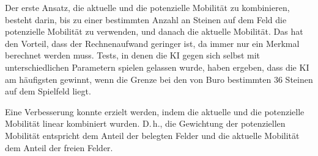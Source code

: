 Der erste Ansatz, die aktuelle und die potenzielle Mobilität zu kombinieren, besteht darin, bis zu einer bestimmten
Anzahl an Steinen auf dem Feld die potenzielle Mobilität zu verwenden, und danach die aktuelle Mobilität. Das hat den
Vorteil, dass der Rechnenaufwand geringer ist, da immer nur ein Merkmal berechnet werden muss. Tests, in denen die KI
gegen sich selbst mit unterschiedlichen Parametern spielen gelassen wurde, haben ergeben, dass die KI am häufigsten
gewinnt, wenn die Grenze bei den von Buro bestimmten 36 Steinen auf dem Spielfeld liegt.

Eine Verbesserung konnte erzielt werden, indem die aktuelle und die potenzielle Mobilität linear kombiniert wurden.
D.\,h., die Gewichtung der potenziellen Mobilität entspricht dem Anteil der belegten Felder und die aktuelle Mobilität
dem Anteil der freien Felder.
